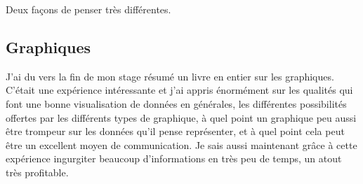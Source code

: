Deux façons de penser très différentes.

\subsection{Graphiques}
J'ai du vers la fin de mon stage résumé un livre en entier sur les graphiques. C'était une expérience intéressante et j'ai appris énormément sur les qualités qui font une bonne visualisation de données en générales, les différentes possibilités offertes par les différents types de graphique, à quel point un graphique peu aussi être trompeur sur les données qu'il pense représenter, et à quel point cela peut être un excellent moyen de communication. Je sais aussi maintenant grâce à cette expérience ingurgiter beaucoup d'informations en très peu de temps, un atout très profitable.
